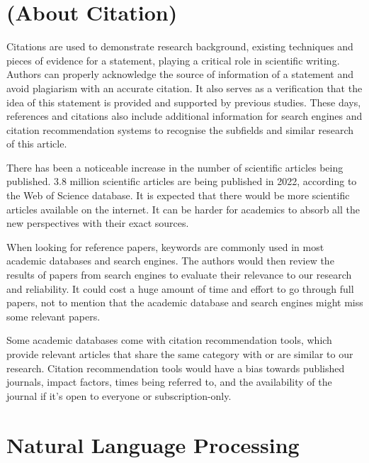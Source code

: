 \section{(About Citation)}

Citations are used to demonstrate research background, existing techniques and pieces of evidence for a statement, playing a critical role in scientific writing.
Authors can properly acknowledge the source of information of a statement and avoid plagiarism with an accurate citation.
It also serves as a verification that the idea of this statement is provided and supported by previous studies.
These days, references and citations also include additional information for search engines and citation recommendation systems to recognise the subfields and similar research of this article.

There has been a noticeable increase in the number of scientific articles being published.
3.8 million scientific articles are being published in 2022, according to the Web of Science database.
It is expected that there would be more scientific articles available on the internet.
It can be harder for academics to absorb all the new perspectives with their exact sources.

When looking for reference papers, keywords are commonly used in most academic databases and search engines.
The authors would then review the results of papers from search engines to evaluate their relevance to our research and reliability.
It could cost a huge amount of time and effort to go through full papers, not to mention that the academic database and search engines might miss some relevant papers.

Some academic databases come with citation recommendation tools, which provide relevant articles that share the same category with or are similar to our research.
Citation recommendation tools would have a bias towards published journals, impact factors, times being referred to, and the availability of the journal if it's open to everyone or subscription-only.

\section{Natural Language Processing}

